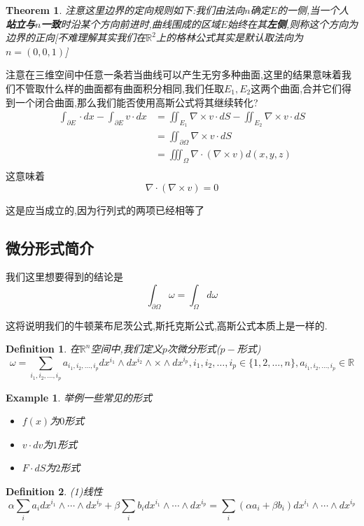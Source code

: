 \documentclass[11pt,hyperref,a4paper,UTF8]{ctexart}
\newtheorem{theorem}{Theorem}[subsection]
\newtheorem{example}{Example}[subsection]
\newtheorem{definition}{Definition}[subsection]
\newcommand{\RR}{\mathbb{R}}
\begin{document}
\begin{CJK}{UTF8}{gkai}
\begin{theorem}
  注意这里边界的定向规则如下:我们由法向$n$确定$E$的一侧,当一个人\textbf{站立与}$n$\textbf{一致}时沿某个方向前进时,曲线围成的区域$E$始终在其\textbf{左侧},则称这个方向为边界的正向[不难理解其实我们在$\RR^2$上的格林公式其实是默认取法向为$n = (0,0,1)$]
\end{theorem}

注意在三维空间中任意一条若当曲线可以产生无穷多种曲面,这里的结果意味着我们不管取什么样的曲面都有曲面积分相同,我们任取$E_1,E_2$这两个曲面,合并它们得到一个闭合曲面,那么我们能否使用高斯公式将其继续转化?
\[
  \begin{aligned}  
    \int_{\partial E} \cdot dx - \int_{\partial E} v\cdot dx &= \iint_{E_1} \nabla \times v \cdot dS - \iint_{E_2} \nabla \times v \cdot dS\\
    &= \iint_{\partial \Omega} \nabla \times v\cdot dS\\
    &= \iiint_{\Omega} \nabla \cdot(\nabla \times v )d(x,y,z)\\
  \end{aligned}
  \]
这意味着
\[\nabla \cdot (\nabla \times v) = 0\]

这是应当成立的,因为行列式的两项已经相等了

\subsection{微分形式简介}
我们这里想要得到的结论是
\[\int_{\partial \Omega} \omega = \int_{\Omega}d\omega\]

这将说明我们的牛顿莱布尼茨公式,斯托克斯公式,高斯公式本质上是一样的.

\begin{definition}
  在$\RR^n$空间中,我们定义$p$次微分形式($p-$形式)
  \[\omega = \sum_{i_1,i_2,\ldots,i_p} a_{i_1,i_2,\ldots,i_p} dx^{i_1}\wedge dx^{i_2}\wedge \times \wedge dx^{i_p}, i_1,i_2,\ldots,i_p\in \{1,2,\ldots,n\},a_{i_1,i_2,\ldots,i_p} \in \RR\]
\end{definition}

\begin{example}
  举例一些常见的形式
  \begin{itemize}
    \item $f(x)$为$0$形式
    \item $v\cdot dv$为$1$形式
    \item $F\cdot dS$为$2$形式
  \end{itemize}
\end{example}

\begin{definition}
  (1)线性
  \[\alpha \sum_{i} a_i dx^{i_1}\wedge \cdots \wedge dx^{i_p} + \beta \sum_{i} b_i dx^{i_1}\wedge \cdots \wedge dx^{i_p} = \sum_i (\alpha a_i+ \beta b_i) dx^{i_1}\wedge \cdots \wedge dx^{i_p}\]


\end{definition}
\end{CJK}
\end{document}
